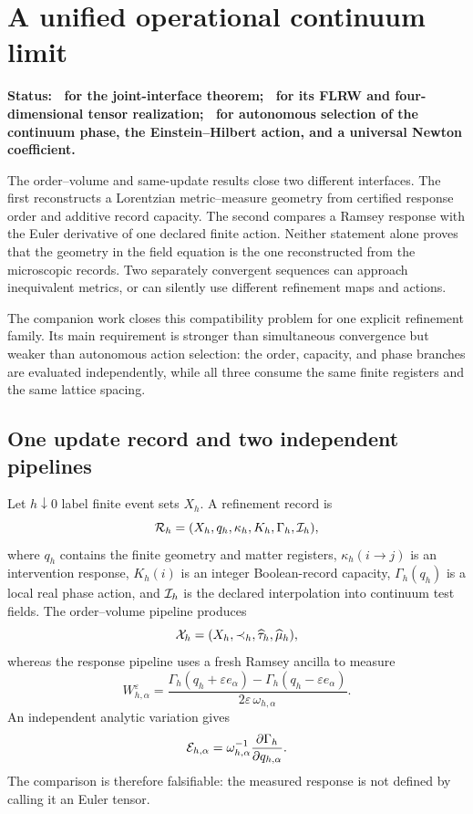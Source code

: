 \section{A unified operational continuum limit}
\label{sec:unified-operational-continuum}

\textbf{Status: \StatusAbstract\ for the joint-interface theorem;
\StatusNumerical\ for its FLRW and four-dimensional tensor realization;
\StatusOpen\ for autonomous selection of the continuum phase, the
Einstein--Hilbert action, and a universal Newton coefficient.}

The order--volume and same-update results close two different interfaces.
The first reconstructs a Lorentzian metric--measure geometry from certified
response order and additive record capacity.  The second compares a Ramsey
response with the Euler derivative of one declared finite action.  Neither
statement alone proves that the geometry in the field equation is the one
reconstructed from the microscopic records.  Two separately convergent
sequences can approach inequivalent metrics, or can silently use different
refinement maps and actions.

The companion work \cite{XuUnifiedContinuum2026} closes this compatibility
problem for one explicit refinement family.  Its main requirement is
stronger than simultaneous convergence but weaker than autonomous action
selection: the order, capacity, and phase branches are evaluated
independently, while all three consume the same finite registers and the
same lattice spacing.

\subsection{One update record and two independent pipelines}

Let \(h\downarrow0\) label finite event sets \(X_h\).  A refinement record is
\begin{equation}
 {\cal R}_h=(X_h,q_h,\kappa_h,K_h,\Gamma_h,{\cal I}_h),
 \label{eq:unified-record}
\end{equation}
where \(q_h\) contains the finite geometry and matter registers,
\(\kappa_h(i\to j)\) is an intervention response, \(K_h(i)\) is an integer
Boolean-record capacity, \(\Gamma_h(q_h)\) is a local real phase action, and
\({\cal I}_h\) is the declared interpolation into continuum test fields.
The order--volume pipeline produces
\[
 {\cal X}_h=(X_h,\prec_h,\widehat\tau_h,\widehat\mu_h),
\]
whereas the response pipeline uses a fresh Ramsey ancilla to measure
\begin{equation}
 W_{h,\alpha}^{\varepsilon}
 =\frac{\Gamma_h(q_h+\varepsilon e_\alpha)
              -\Gamma_h(q_h-\varepsilon e_\alpha)}
        {2\varepsilon\,\omega_{h,\alpha}} .
 \label{eq:unified-ramsey-score}
\end{equation}
An independent analytic variation gives
\begin{equation}
 {\cal E}_{h,\alpha}
 =\omega_{h,\alpha}^{-1}
  \frac{\partial\Gamma_h}{\partial q_{h,\alpha}} .
 \label{eq:unified-euler-score}
\end{equation}
The comparison is therefore falsifiable: the measured response is not
defined by calling it an Euler tensor.

